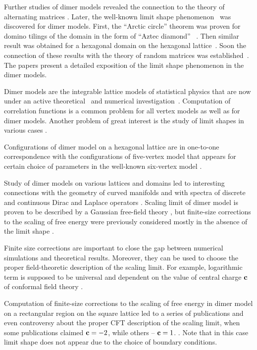 \documentclass{article}
\begin{document}
Further studies of dimer models revealed the connection to the theory of alternating matrices
\cite{elkies1992alternating1,elkies1992alternating2}. Later, the well-known limit shape
phenomenon~\cite{vershik1977kerov} was discovered for dimer models. First, the ``Arctic circle''
theorem was proven for domino tilings of the domain in the form of ``Aztec diamond''
~\cite{1998math......1068J}. Then similar result was obtained for a hexagonal domain on the
hexagonal lattice~\cite{cohn1998shape}. Soon the connection of these results with the theory of
random matrices was established~\cite{johansson2002non}. The papers
\cite{kenyon2006dimers,kenyon2009lectures} present a detailed exposition of the limit shape
phenomenon in the dimer models.

Dimer models are the integrable lattice models of statistical physics that are now under an active
theoretical~\cite{zj2000,ferrari} and numerical investigation~\cite{ks2018}. Computation of
correlation functions is a common problem for all vertex models \cite{colomo2012approach} as well as
for dimer models. Another problem of great interest is the study of limit shapes in various cases
\cite{borodin2010q,di2018tangent}.

Configurations of dimer model on a hexagonal lattice are in one-to-one correspondence with the
configurations of five-vertex model that appears for certain choice of parameters in the well-known
six-vertex model \cite{kapitonov2012weighted,kapitonov2008five}.

Study of dimer models on various lattices and domains led to interesting connections with the
geometry of curved manifolds and with spectra of discrete and continuous Dirac and Laplace operators
\cite{kenyon2002laplacian,kenyon2000asymptotic}. Scaling limit of dimer model is proven to be
described by a Gaussian free-field theory \cite{kenyon2001dominos}, but finite-size corrections to
the scaling of free energy were previously considered mostly in the absence of the limit shape
\cite{Sh_Izmailian_2019,izmailian2016finite,izmailian2011dimer,izmailian2007non,izmailian2005logarithmic}.

Finite size corrections are important to close the gap between numerical simulations and
theoretical results. Moreover, they can be used to choose the proper field-theoretic description of
the scaling limit. For example, logarithmic term is supposed to be universal and dependent on the
value of central charge ${\bf c}$ of conformal field theory \cite{cardy1988finite}.

Computation of finite-size corrections to the scaling of free energy in dimer model on a rectangular
region on the square lattice led to a series of publications and even controversy about the proper CFT
description of the scaling limit, when some publications claimed ${\bf c}=-2$, while others -- ${\bf c}=1$. 
\cite{allegra2015exact,morin2016integrability,Sh_Izmailian_2019,izmailian2016finite,izmailian2005logarithmic}. 
Note that in this case limit shape does not appear due to the choice of boundary conditions. 
\end{document}
